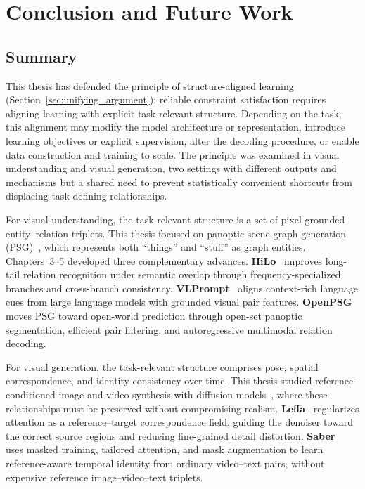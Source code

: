 
\chapter{Conclusion and Future Work}

\section{Summary}
This thesis has defended the principle of structure-aligned learning (Section~\ref{sec:unifying_argument}): reliable constraint satisfaction requires aligning learning with explicit task-relevant structure. Depending on the task, this alignment may modify the model architecture or representation, introduce learning objectives or explicit supervision, alter the decoding procedure, or enable data construction and training to scale. The principle was examined in visual understanding and visual generation, two settings with different outputs and mechanisms but a shared need to prevent statistically convenient shortcuts from displacing task-defining relationships.

For visual understanding, the task-relevant structure is a set of pixel-grounded entity--relation triplets. This thesis focused on panoptic scene graph generation (PSG)~\citep{yang2022panoptic}, which represents both ``things'' and ``stuff'' as graph entities. Chapters~3--5 developed three complementary advances. \textbf{HiLo}~\citep{zhou2023hilo} improves long-tail relation recognition under semantic overlap through frequency-specialized branches and cross-branch consistency. \textbf{VLPrompt}~\citep{zhou2025vlprompt} aligns context-rich language cues from large language models with grounded visual pair features. \textbf{OpenPSG}~\citep{zhou2025openpsg} moves PSG toward open-world prediction through open-set panoptic segmentation, efficient pair filtering, and autoregressive multimodal relation decoding.

For visual generation, the task-relevant structure comprises pose, spatial correspondence, and identity consistency over time. This thesis studied reference-conditioned image and video synthesis with diffusion models~\citep{ho2020denoising, rombach2022high}, where these relationships must be preserved without compromising realism. \textbf{Leffa}~\citep{zhou2025learning} regularizes attention as a reference--target correspondence field, guiding the denoiser toward the correct source regions and reducing fine-grained detail distortion. \textbf{Saber}~\citep{zhou2025scaling} uses masked training, tailored attention, and mask augmentation to learn reference-aware temporal identity from ordinary video--text pairs, without expensive reference image--video--text triplets.

